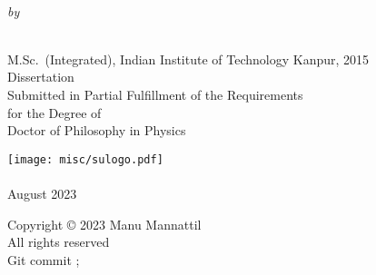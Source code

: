 
\newpage\thispagestyle{empty}

\begin{center*}
  \begin{Spacing}{2.0}
  {\LARGE{}}\\
  \end{Spacing}
  \vspace{3em}
  \emph{by}\\[3em]
  \\
  \vspace{1em}
  \begin{Spacing}{1.25}
  M.Sc.~(Integrated), Indian Institute of Technology Kanpur, 2015\\[5em]
  Dissertation\\
  Submitted in Partial Fulfillment of the Requirements\\
  for the Degree of\\
  Doctor of Philosophy in Physics\\[5em]
  \end{Spacing}

  \ifsustyle
    \relax
  \else
    \texttt{[image: misc/sulogo.pdf]}\\[1em]
  \fi
  \\[1em]
  August 2023
\end{center*}


\newpage\thispagestyle{empty}

\begin{center*}
  \begin{Spacing}{1.25}
  Copyright {\copyright} 2023 Manu Mannattil\\
  All rights reserved
  \ifsustyle
    \relax
  \else
    \phantom{}\\[2em]\color{gray}Git commit \href{https://github.com/manu-mannattil/thesis/tree/\gitHash}{\texttt{\gitShortHash}}; \gitCommitterDate
  \fi
  \end{Spacing}
\end{center*}


